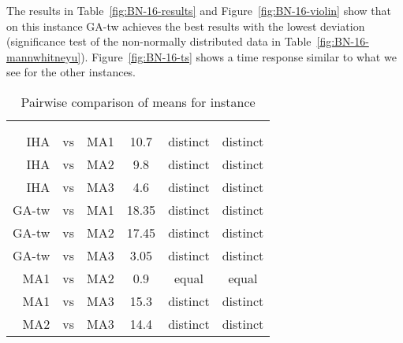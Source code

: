 \documentclass[thesis.tex]{subfiles}
\begin{document}
\subsubsection{}
   \renewcommand{\CurrentInstance}{\Instance{BN\textunderscore{}16}}
   \renewcommand{\CurrentInstanceFileEscaped}{BN-16}
   \renewcommand{\CurrentInstanceTexEscaped}{BN\textunderscore{}16}



The results in Table~\vref{fig:BN-16-results} and Figure~\vref{fig:BN-16-violin} show that on this instance \gls{GA-tw} achieves the best results with the lowest deviation (significance test of the non-normally distributed data in Table~\vref{fig:BN-16-mannwhitneyu}). Figure~\vref{fig:BN-16-ts} shows a time response similar to what we see for the other instances.
\begin{table}[htbp]
   \caption{Pairwise comparison of means for instance \CurrentInstance}
   \label{fig:\CurrentInstanceFileEscaped-mannwhitneyu}
   \centering\small
      \begin{tabular}{r@{\ }c@{\ }l S[table-format=2.2] c c} \toprule
         &&&                          &  \\ \cmidrule(lr){5-6}
         &&&  &  &  \\ \midrule

         \gls{IHA} &vs& \gls{MA1}   & 10.7  & distinct & distinct \\
         \gls{IHA} &vs& \gls{MA2}   &  9.8  & distinct & distinct \\
         \gls{IHA} &vs& \gls{MA3}   &  4.6  & distinct & distinct \\
         \gls{GA-tw} &vs& \gls{MA1} & 18.35 & distinct & distinct \\
         \gls{GA-tw} &vs& \gls{MA2} & 17.45 & distinct & distinct \\
         \gls{GA-tw} &vs& \gls{MA3} &  3.05 & distinct & distinct \\
         \gls{MA1} &vs& \gls{MA2}   &  0.9  &  equal   &  equal   \\
         \gls{MA1} &vs& \gls{MA3}   & 15.3  & distinct & distinct \\
         \gls{MA2} &vs& \gls{MA3}   & 14.4  & distinct & distinct \\
         \bottomrule
      \end{tabular}
\end{table}
\end{document}

